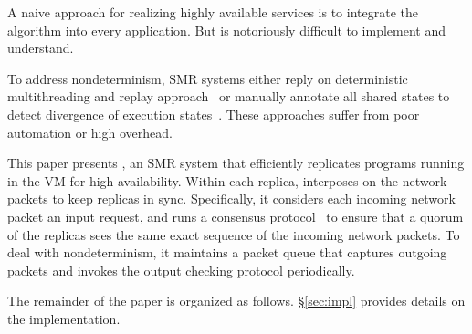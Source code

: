 A naive approach for realizing highly available services is to integrate the \paxos algorithm 
into every application. But \paxos is notoriously difficult to implement and understand.

To address nondeterminism, SMR systems either reply on deterministic multithreading and replay 
approach~\cite{rex:eurosys14} or manually annotate all shared states to detect divergence of execution 
states~\cite{eve:osdi12}. These approaches suffer from poor automation or high overhead.


This paper presents \xxx, an SMR system that efficiently replicates programs running in the 
VM for high availability. Within each replica, \xxx interposes on the network packets to keep 
replicas in sync. Specifically, it considers each incoming network packet an input request, and runs 
a \paxos consensus protocol~\cite{paxos:practical} to ensure that a quorum of the replicas sees the 
same exact sequence of the incoming network packets. To deal with nondeterminism, it maintains a 
packet queue that captures outgoing packets and invokes the output checking protocol periodically.

The remainder of the paper is organized as follows. \S\ref{sec:impl} provides details on the 
implementation.
